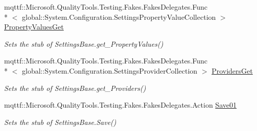 \begin{DoxyCompactItemize}
mqttf\-::\-Microsoft.\-Quality\-Tools.\-Testing.\-Fakes.\-Fakes\-Delegates.\-Func\\*
$<$ global\-::\-System.\-Configuration.\-Settings\-Property\-Value\-Collection $>$ \hyperlink{class_system_1_1_configuration_1_1_fakes_1_1_stub_settings_base_a9b833de378e6b638f48bb1d3fc54fa31}{Property\-Values\-Get}
\begin{DoxyCompactList}\small\item\em Sets the stub of Settings\-Base.\-get\-\_\-\-Property\-Values()\end{DoxyCompactList}\item 
mqttf\-::\-Microsoft.\-Quality\-Tools.\-Testing.\-Fakes.\-Fakes\-Delegates.\-Func\\*
$<$ global\-::\-System.\-Configuration.\-Settings\-Provider\-Collection $>$ \hyperlink{class_system_1_1_configuration_1_1_fakes_1_1_stub_settings_base_a882ba11dbd1120fdb06d2b55b12cc50e}{Providers\-Get}
\begin{DoxyCompactList}\small\item\em Sets the stub of Settings\-Base.\-get\-\_\-\-Providers()\end{DoxyCompactList}\item 
mqttf\-::\-Microsoft.\-Quality\-Tools.\-Testing.\-Fakes.\-Fakes\-Delegates.\-Action \hyperlink{class_system_1_1_configuration_1_1_fakes_1_1_stub_settings_base_a6e105316063a5be8fd5db374127eee82}{Save01}
\begin{DoxyCompactList}\small\item\em Sets the stub of Settings\-Base.\-Save()\end{DoxyCompactList}\end{DoxyCompactItemize}
